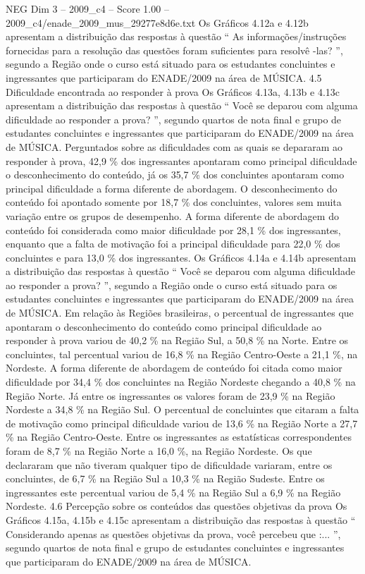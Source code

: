 \begin{textsample}{NEG Dim 3 – 2009\_c4 – Score 1.00 – 2009\_c4/enade\_2009\_mus\_29277e8d6e.txt}
Os Gráficos 4.12a e 4.12b apresentam a distribuição das respostas à questão “ As informações/instruções fornecidas para a resolução das questões foram suficientes para resolvê -las? ”, segundo a Região onde o curso está situado para os estudantes concluintes e ingressantes que participaram do ENADE/2009 na área de MÚSICA. 4.5 Dificuldade encontrada ao responder à prova Os Gráficos 4.13a, 4.13b e 4.13c apresentam a distribuição das respostas à questão “ Você se deparou com alguma dificuldade ao responder a prova? ”, segundo quartos de nota final e grupo de estudantes concluintes e ingressantes que participaram do ENADE/2009 na área de MÚSICA.
Perguntados sobre as dificuldades com as quais se depararam ao responder à prova, 42,9 \% dos ingressantes apontaram como principal dificuldade o desconhecimento do conteúdo, já os 35,7 \% dos concluintes apontaram como principal dificuldade a forma diferente de abordagem.
O desconhecimento do conteúdo foi apontado somente por 18,7 \% dos concluintes, valores sem muita variação entre os grupos de desempenho.
A forma diferente de abordagem do conteúdo foi considerada como maior dificuldade por 28,1 \% dos ingressantes, enquanto que a falta de motivação foi a principal dificuldade para 22,0 \% dos concluintes e para 13,0 \% dos ingressantes.
Os Gráficos 4.14a e 4.14b apresentam a distribuição das respostas à questão “ Você se deparou com alguma dificuldade ao responder a prova? ”, segundo a Região onde o curso está situado para os estudantes concluintes e ingressantes que participaram do ENADE/2009 na área de MÚSICA.
Em relação às Regiões brasileiras, o percentual de ingressantes que apontaram o desconhecimento do conteúdo como principal dificuldade ao responder à prova variou de 40,2 \% na Região Sul, a 50,8 \% na Norte.
Entre os concluintes, tal percentual variou de 16,8 \% na Região Centro-Oeste a 21,1 \%, na Nordeste.
A forma diferente de abordagem de conteúdo foi citada como maior dificuldade por 34,4 \% dos concluintes na Região Nordeste chegando a 40,8 \% na Região Norte.
Já entre os ingressantes os valores foram de 23,9 \% na Região Nordeste a 34,8 \% na Região Sul.
O percentual de concluintes que citaram a falta de motivação como principal dificuldade variou de 13,6 \% na Região Norte a 27,7 \% na Região Centro-Oeste.
Entre os ingressantes as estatísticas correspondentes foram de 8,7 \% na Região Norte a 16,0 \%, na Região Nordeste.
Os que declararam que não tiveram qualquer tipo de dificuldade variaram, entre os concluintes, de 6,7 \% na Região Sul a 10,3 \% na Região Sudeste.
Entre os ingressantes este percentual variou de 5,4 \% na Região Sul a 6,9 \% na Região Nordeste. 4.6 Percepção sobre os conteúdos das questões objetivas da prova Os Gráficos 4.15a, 4.15b e 4.15c apresentam a distribuição das respostas à questão “ Considerando apenas as questões objetivas da prova, você percebeu que :... ”, segundo quartos de nota final e grupo de estudantes concluintes e ingressantes que participaram do ENADE/2009 na área de MÚSICA.

\end{textsample}
